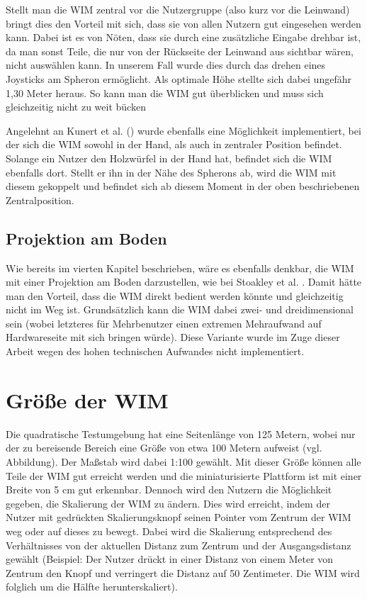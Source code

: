 Stellt man die WIM zentral vor die Nutzergruppe (also kurz vor die Leinwand) bringt dies den Vorteil mit sich, dass sie von allen Nutzern gut eingesehen werden kann.
Dabei ist es von Nöten, dass sie durch eine zusätzliche Eingabe drehbar ist, da man sonst Teile, die nur von der Rückseite der Leinwand aus sichtbar wären, nicht auswählen kann.
In unserem Fall wurde dies durch das drehen eines Joysticks am Spheron ermöglicht.
Als optimale Höhe stellte sich dabei ungefähr 1,30 Meter heraus. So kann man die WIM gut überblicken und muss sich gleichzeitig nicht zu weit bücken

Angelehnt an Kunert et al. (\cite{Kunert2014Photoportals}) wurde ebenfalls eine Möglichkeit implementiert, bei der sich die WIM sowohl in der Hand, als auch in zentraler Position befindet. Solange ein Nutzer den Holzwürfel in der Hand hat, befindet sich die WIM ebenfalls dort. Stellt er ihn in der Nähe des Spherons ab, wird die WIM mit diesem gekoppelt und befindet sich ab diesem Moment in der oben beschriebenen Zentralposition.

\subsection{Projektion am Boden}
Wie bereits im vierten Kapitel beschrieben, wäre es ebenfalls denkbar, die WIM mit einer Projektion am Boden darzustellen, wie bei Stoakley et al. \cite{Stoakley2010VirtualWIMb}.
Damit hätte man den Vorteil, dass die WIM direkt bedient werden könnte und gleichzeitig nicht im Weg ist. Grundsätzlich kann die WIM dabei zwei- und dreidimensional sein (wobei letzteres für Mehrbenutzer einen extremen Mehraufwand auf Hardwareseite mit sich bringen würde). Diese Variante wurde im Zuge dieser Arbeit wegen des hohen technischen Aufwandes nicht implementiert.

\section{Größe der WIM}
Die quadratische Testumgebung hat eine Seitenlänge von 125 Metern, wobei nur der zu bereisende Bereich eine Größe von etwa 100 Metern aufweist (vgl. Abbildung).
Der Maßstab wird dabei 1:100 gewählt. Mit dieser Größe können alle Teile der WIM gut erreicht werden und die miniaturisierte Plattform ist mit einer Breite von 5 cm gut erkennbar. 
Dennoch wird den Nutzern die Möglichkeit gegeben, die Skalierung der WIM zu ändern. Dies wird erreicht, indem der Nutzer mit gedrückten Skalierungsknopf seinen Pointer vom Zentrum der WIM weg oder auf dieses zu bewegt. Dabei wird die Skalierung entsprechend des Verhältnisses von der aktuellen Distanz zum Zentrum und der Ausgangsdistanz gewählt (Beispiel: Der Nutzer drückt in einer Distanz von einem Meter von Zentrum den Knopf und verringert die Distanz auf 50 Zentimeter. Die WIM wird folglich um die Hälfte herunterskaliert).

